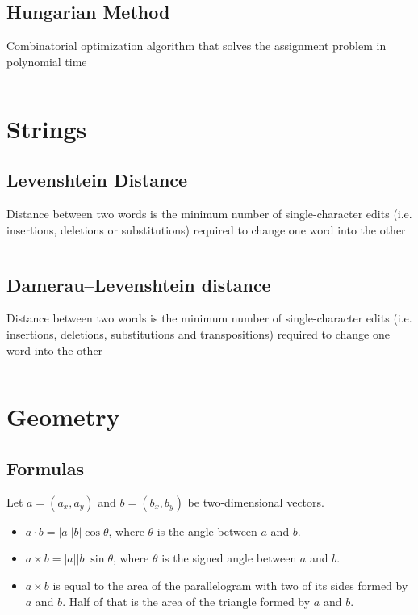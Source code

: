 \documentclass[9pt,a4paper,twocolumn,landscape,oneside]{amsart}
\newcommand{\code}[1]{\inputminted{cpp}{_Code/#1}}
\begin{document}
    \subsection{Hungarian Method}
        Combinatorial optimization algorithm that solves the assignment
        problem in polynomial time
        \code{Optimization/hungarian_method.cpp}

\section{Strings}
    \subsection{Levenshtein Distance}
        Distance between two words is the minimum number of single-character
        edits (i.e. insertions, deletions or substitutions) required to change
        one word into the other
        \code{Strings/levenshtein.cpp}

      \subsection{Damerau–Levenshtein distance}
          Distance between two words is the minimum number of single-character
          edits (i.e. insertions, deletions, substitutions and transpositions)
          required to change one word into the other
          \code{Strings/damerau_levenshtein.cpp}

\section{Geometry}
    \subsection{Formulas}
        Let $a = (a_x, a_y)$ and $b = (b_x, b_y)$ be two-dimensional vectors.
        \begin{itemize}
            \item $a\cdot b = |a||b|\cos{\theta}$, where $\theta$ is the angle
                between $a$ and $b$.
            \item $a\times b = |a||b|\sin{\theta}$, where $\theta$ is the
                signed angle between $a$ and $b$.
            \item $a\times b$ is equal to the area of the parallelogram with
                two of its sides formed by $a$ and $b$. Half of that is the
                area of the triangle formed by $a$ and $b$.
        \end{itemize}
\end{document}
